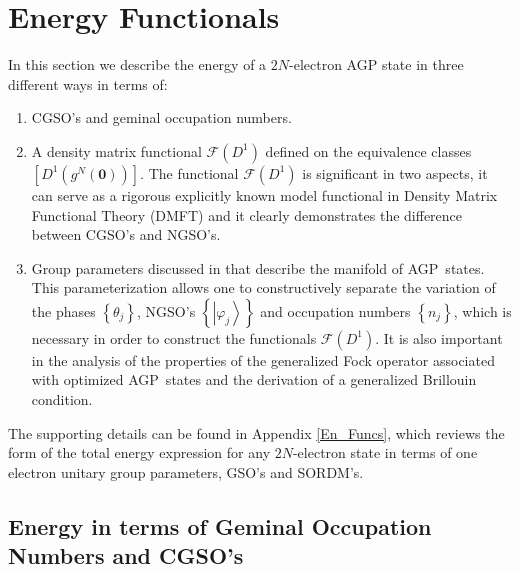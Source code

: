 \documentclass[aps,preprint]{revtex4}%
\begin{document}
\section{Energy Functionals \label{Energy}}

In this section we describe the energy of a $2N$-electron AGP state in three
different ways in terms of:

\begin{enumerate}
\item CGSO's and geminal occupation numbers.

\item A density matrix functional $\mathcal{F}\left(  D^{1}\right)  $ defined
on the equivalence classes $\left[  D^{1}\left(  g^{N}\left(  \bm{0}\right)
\right)  \right]  .$ The functional $\mathcal{F}\left(  D^{1}\right)  $ is
significant in two aspects, it can serve as a rigorous explicitly known model
functional in Density Matrix Functional Theory (DMFT) \cite{Cioslowski01}%
\cite{Staroverov02}\cite{Cioslowski02} and it clearly demonstrates the
difference between CGSO's and NGSO's.

\item Group parameters discussed in \cite{AGPCoherent} that describe the
manifold of AGP\ states. This parameterization allows one to constructively
separate the variation of the phases $\left\{  \theta_{j}\right\}  $, NGSO's
$\left\{  \left\vert \varphi_{j}\right\rangle \right\}  $ and occupation
numbers $\left\{  n_{j}\right\}  $, which is necessary in order to construct
the functionals $\mathcal{F}\left(  D^{1}\right)  $. It is also important in
the analysis of the properties of the generalized Fock operator associated
with optimized AGP\ states and the derivation of a generalized Brillouin condition.
\end{enumerate}

The supporting details can be found in Appendix \ref{En_Funcs}, which reviews
the form of the total energy expression for any $2N$-electron state in terms
of one electron unitary group parameters, GSO's and SORDM's.

\subsection{Energy in terms of Geminal Occupation Numbers and
CGSO's\label{EnON_CGSO}}
\end{document}
